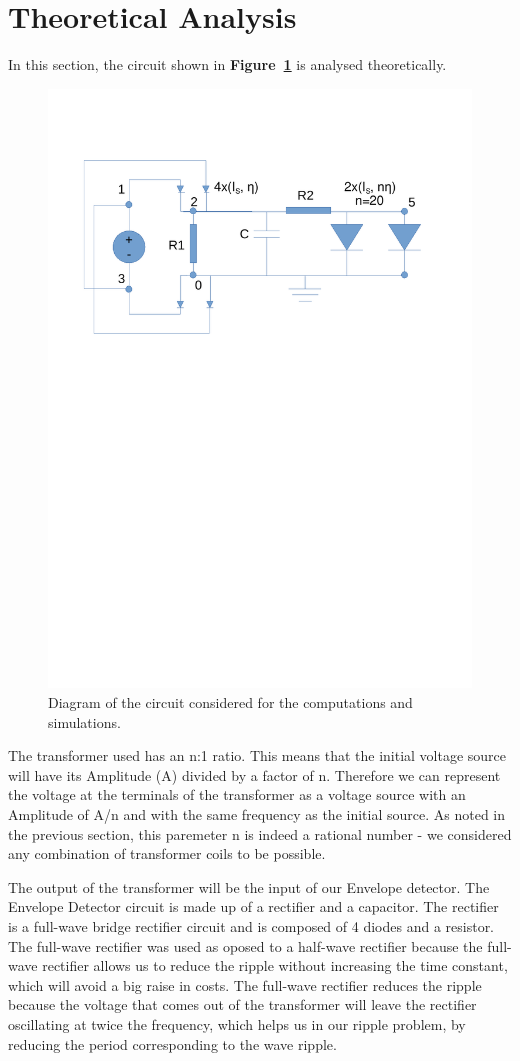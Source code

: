 \section{Theoretical Analysis}
\label{sec:analysis}

In this section, the circuit shown in \textbf{Figure~\ref{fig:diagram_t3}} is analysed
theoretically.
\begin{figure}[H] \centering
\includegraphics[width=0.5\linewidth]{diagram_t3.pdf}
\vspace{-6cm}
\caption{Diagram of the circuit considered for the computations and simulations.}
\label{fig:diagram_t3}
\end{figure}

The transformer used has an n:1 ratio. This means that the initial voltage source will have its Amplitude (A) divided by a factor of n. Therefore we can represent the voltage at the terminals of the transformer as a voltage source with an Amplitude of A/n and with the same frequency as the initial source. As noted in the previous section, this paremeter n is indeed a rational number - we considered any combination of transformer coils to be possible.

The output of the transformer will be the input of our Envelope detector. The Envelope Detector circuit is made up of a rectifier and a capacitor. The rectifier is a full-wave bridge rectifier circuit and is composed of 4 diodes and a resistor. The full-wave rectifier was used as oposed to a half-wave rectifier because the full-wave rectifier allows us to reduce the ripple without increasing the time constant, which will avoid a big raise in costs. The full-wave rectifier reduces the ripple because the voltage that comes out of the transformer will leave the rectifier oscillating at twice the frequency, which helps us in our ripple problem, by reducing the period corresponding to the wave ripple.

